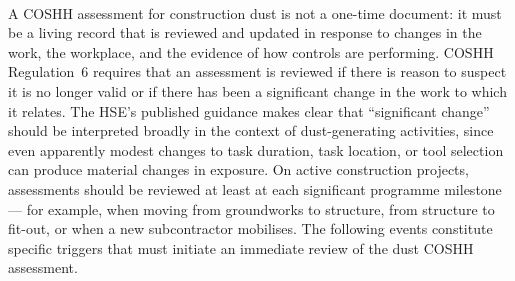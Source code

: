 \paragraph{}
A COSHH assessment for construction dust is not a one-time document: it must be a living record that is reviewed and updated in response to changes in the work, the workplace, and the evidence of how controls are performing. COSHH Regulation~6 requires that an assessment is reviewed if there is reason to suspect it is no longer valid or if there has been a significant change in the work to which it relates. The HSE's published guidance makes clear that ``significant change'' should be interpreted broadly in the context of dust-generating activities, since even apparently modest changes to task duration, task location, or tool selection can produce material changes in exposure. On active construction projects, assessments should be reviewed at least at each significant programme milestone --- for example, when moving from groundworks to structure, from structure to fit-out, or when a new subcontractor mobilises. The following events constitute specific triggers that must initiate an immediate review of the dust COSHH assessment.

